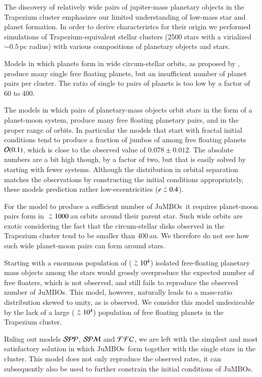 \documentclass[submission,phys]{lib/SciPost}
\def\apgt{\ {\raise-.5ex\hbox{$\buildrel>\over\sim$}}\ }
\def\aplt{\ {\raise-.5ex\hbox{$\buildrel<\over\sim$}}\ }
\newcommand{\jumbos}{\mbox{JuMBOs}}
\begin{document}
The discovery of relatively wide pairs of jupiter-mass planetary
objects in the Trapezium cluster emphasizes our limited understanding
of low-mass star and planet formation. In order to derive
characteristcs for their origin we performed simulations of
Trapezium-equivalent stellar clusters (2500 stars with a virialized
$\sim 0.5$\,pc radius) with various compositions of planetary objects
and stars.

Models in which planets form in wide circum-stellar orbits, as
proposed by \cite{2023arXiv231006016W}, produce many single free
floating planets, but an insufficient number of planet pairs per
cluster. The ratio of single to pairs of planets is too low by a
factor of 60 to 400.

The models in which pairs of planetary-mass objects orbit stars in the
form of a planet-moon system, produce many free floating planetary
pairs, and in the proper range of orbits.  In particular the models
that start with fractal initial conditions tend to produce a fraction
of jumbos of among free floating planets ${\cal O}(0.1)$, which is
close to the observed value of $0.078\pm0.012$.  The absolute numbers
are a bit high though, by a factor of two, but that is easily solved
by starting with fewer systems.  Although the distribution in orbital
separation matches the observations by constructing the initial
conditions appropriately, these models prediction rather
low-eccentricities ($e\aplt 0.4$).

For the model to produce a sufficient number of \jumbos\, it requires
planet-moon pairs form in $\apgt 1000$\,au orbits around their parent
star. Such wide orbits are exotic considering the fact that the
circum-stellar disks observed in the Trapezium cluster tend to be
smaller than 400\,au. We therefore do not see how such wide
planet-moon pairs can form around stars.

Starting with a enormous population of ($\apgt 10^4$) isolated
free-floating planetary mass objects among the stars would grossly
overproduce the expected number of free floaters, which is not
observed, and still fails to reproduce the observed number of \jumbos.
This model, however, naturally leads to a mass-ratio distribution
skewed to unity, as is observed. We consider this model undesireable
by the lack of a large ($\apgt 10^4$) population of free floating
planets in the Trapezium cluster.

Ruling out models ${\cal SPP}$, ${\cal SPM}$ and ${\cal FFC}$, we are
left with the simplest and most satisfactory solution in which
\jumbos\, form together with the single stars in the cluster.  This
model does not only reproduce the observed rates, it can subsequently
also be used to further constrain the initial conditions of \jumbos.
\end{document}
